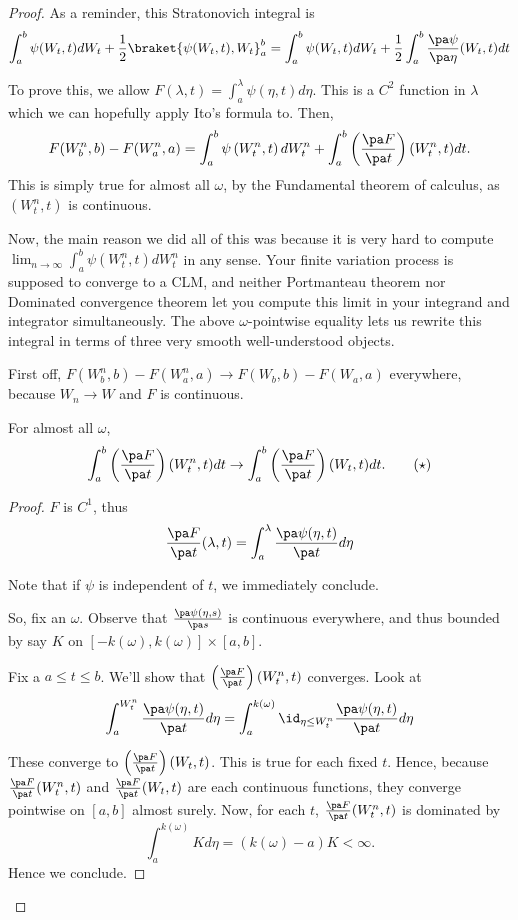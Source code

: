 \documentclass{scrartcl}
\begin{document}
\begin{proof}
As a reminder, this Stratonovich integral is
$$
\int_a^b \psi(W_t, t)dW_t + \frac12 \braket{\psi(W_t,t), W_t}_a^b = \int_a^b\psi(W_t, t)dW_t + \frac12 \int_a^b\frac{\pa\psi}{\pa \eta}(W_t,t) dt$$

To prove this, we allow $F(\lambda, t) = \int_a^\lambda \psi(\eta, t)d\eta$. This is a $C^2$ function in $\lambda$ which we can hopefully apply Ito's formula to. Then,$$F(W^n_b, b) - F(W^n_a,a) = \int_a^b \psi\left(W^n_t, t\right) dW^n_t + \int_a^b \left(\frac{\pa F}{\pa t}\right)(W^n_t, t)dt.$$This is simply true for almost all $\omega$, by the Fundamental theorem of calculus, as $(W^n_t, t)$ is continuous.

Now, the main reason we did all of this was because it is very hard to compute $\lim_{n\to \infty} \int_a^b \psi\left(W^n_t, t\right) dW^n_t$ in any sense. Your finite variation process is supposed to converge to a CLM, and neither Portmanteau theorem nor Dominated convergence theorem let you compute this limit in your integrand and integrator simultaneously. The above $\omega$-pointwise equality lets us rewrite this integral in terms of three very smooth well-understood objects.

First off, $F(W^n_b, b) - F(W^n_a, a)\to F(W_b, b) - F(W_a, a)$ everywhere, because $W_n\to W$ and $F$ is continuous.

\begin{claim*}
    For almost all $\omega$,
    \[
        \int_a^b \left(\frac{\pa F}{\pa t}\right)(W^n_t, t)dt\to \int_a^b \left(\frac{\pa F}{\pa t}\right)(W_t, t)dt. \tag{$\star$}
    \]
\end{claim*}

\begin{proof}
$F$ is $C^1$, thus
$$\frac{\pa F}{\pa t}(\lambda, t) = \int_a^\lambda \frac{\pa \psi(\eta, t)}{\pa t} d\eta$$

Note that if $\psi$ is independent of $t$, we immediately conclude.

So, fix an $\omega$. Observe that $\frac{\pa \psi(\eta, s)}{\pa s}$ is continuous everywhere, and thus bounded by say $K$ on $[-k(\omega), k(\omega)]\times [a,b]$.

Fix a $a\leq t\leq b$. We'll show that $\left(\frac{\pa F}{\pa t}\right)(W^n_t, t)$ converges. Look at
$$
\int_a^{W^n_t} \frac{\pa \psi(\eta, t)}{\pa t}d\eta = \int_a^{k(\omega)} \id_{\eta \leq W^n_t} \frac{\pa \psi(\eta, t)}{\pa t}d\eta 
$$

These converge to $\left(\frac{\pa F}{\pa t}\right)\left(W_t, t\right)$. This is true for each fixed $t$. Hence, because $\frac{\pa F}{\pa t}(W^n_t, t)$ and $\frac{\pa F}{\pa t}(W_t, t)$ are each continuous functions, they converge pointwise on $[a,b]$ almost surely. Now, for each $t$, $\frac{\pa F}{\pa t}(W^n_t, t)$ is dominated by
$$
\int_a^{k(\omega)} K d\eta  = (k(\omega) - a)K < \infty.
$$
Hence we conclude.
\end{proof}



\end{proof}
\end{document}
